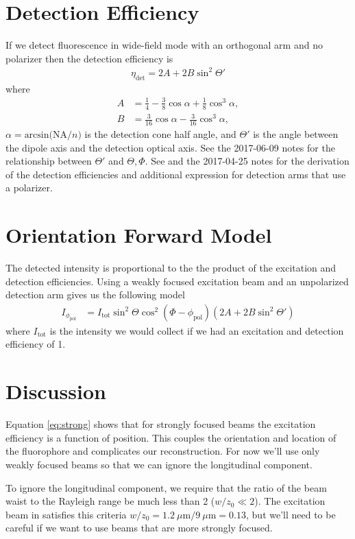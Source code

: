 \documentclass[11pt]{article}
\begin{document}
\section{Detection Efficiency}
If we detect fluorescence in wide-field mode with an orthogonal arm and no
polarizer then the detection efficiency is
\begin{align}
  \eta_{\text{det}} = 2A + 2B\sin^2\Theta'
\end{align}
where
\begin{align}
  A &= \frac{1}{4} - \frac{3}{8}\cos\alpha + \frac{1}{8}\cos^3\alpha,\\
  B &= \frac{3}{16}\cos\alpha - \frac{3}{16}\cos^3\alpha, 
\end{align}
$\alpha = \text{arcsin(NA}/n)$ is the detection cone half angle, and $\Theta'$
is the angle between the dipole axis and the detection optical axis. See the
2017-06-09 notes for the relationship between $\Theta'$ and $\Theta,\Phi$. See
\cite{fourkas} and the 2017-04-25 notes for the derivation of the detection
efficiencies and additional expression for detection arms that use a polarizer.

\section{Orientation Forward Model}
The detected intensity is proportional to the the product of the excitation and
detection efficiencies. Using a weakly focused excitation beam and an
unpolarized detection arm gives us the following model
\begin{align}
  I_{\phi_{\text{pol}}} &= I_{\text{tot}}\sin^2\Theta\cos^2(\Phi - \phi_{\text{pol}})(2A+2B\sin^2\Theta')\label{eq:forward}
\end{align}
where $I_{\text{tot}}$ is the intensity we would collect if we had an excitation and detection efficiency of 1.

\section{Discussion}
Equation \ref{eq:strong} shows that for strongly focused beams the excitation
efficiency is a function of position. This couples the orientation and location
of the fluorophore and complicates our reconstruction. For now we'll use only
weakly focused beams so that we can ignore the longitudinal component.

To ignore the longitudinal component, we require that the ratio of the beam
waist to the Rayleigh range be much less than 2 ($w/z_0 \ll 2$).  The excitation
beam in \cite{wu2013} satisfies this criteria
$w/z_0 = 1.2\ \mu\text{m}/9\ \mu\text{m} = 0.13$, but we'll need to be careful if
we want to use beams that are more strongly focused.
\end{document}
